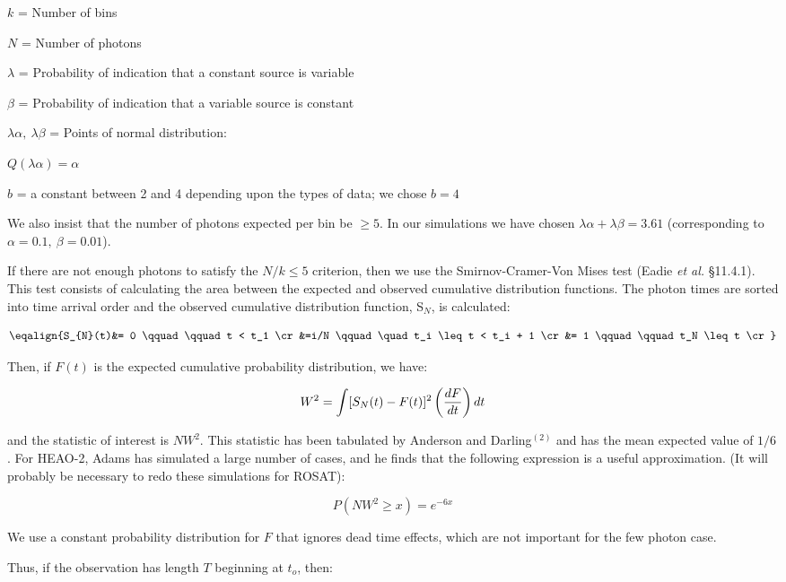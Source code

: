 { \list

$k$ = Number of bins

$N$ = Number of photons
          
$\lambda$ = Probability of indication that a constant source is
variable

$\beta$ = Probability of indication that a variable source is constant

$\lambda\alpha,\ \lambda\beta$ = Points of normal distribution:

$Q(\lambda\alpha) = \alpha$

$b$ = a constant between 2 and 4 depending upon the types of data; we chose $b = 4$

We also insist that the number of photons expected per bin be $\geq5$.  In our
simulations we have chosen $\lambda\alpha + \lambda\beta = 3.61$
(corresponding to $\alpha = 0.1,\ \beta = 0.01$).

}


{\list

If there are not enough photons to satisfy the $N/k \leq 5$ criterion, then we use
the Smirnov-Cramer-Von Mises test (Eadie {\it et al.} \S 11.4.1).  This test
consists of calculating the area between the expected and observed cumulative 
distribution functions.  The photon times are sorted into time arrival order
and the observed cumulative distribution function, S$_{N}$, is
calculated:

}
$$\eqalign{S_{N}(t)&= 0 \qquad\qquad  t < t_1 \cr
&=i/N \qquad\quad t_i \leq t < t_i + 1 \cr
&= 1 \qquad\qquad t_N \leq t \cr }$$

{\list

Then, if $F(t)$ is the expected cumulative probability distribution, we
have:

}

$$W^2 = \int \lbrack S_N(t) - F(t)\rbrack^2 \left( {dF\over dt}\right) dt$$

{\list

and the statistic of interest is $NW^2$.  This statistic has been tabulated
by Anderson and Darling$^{(2)}$ and has the mean expected value of $1/6$.  
For HEAO-2, Adams has simulated a large number of cases, and he finds that 
the following expression is a useful approximation.  (It will probably be
necessary to redo these simulations for ROSAT):

}

$$P(NW^2 \geq x) = e^{-6x}$$

{\list

We use a constant probability distribution for $F$ that ignores dead
time effects, which are not important for the few photon case.

Thus, if the observation has length $T$ beginning at $t_o$, then:

}

